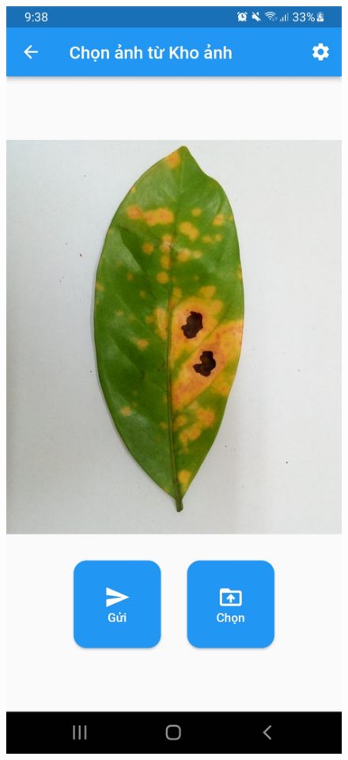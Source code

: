 \documentclass[a4paper,14pt]{extarticle}
\begin{document}
\begin{figure}[H]
		\includegraphics[scale=0.1]{images/screenshot3.jpg}

\end{figure}
\end{document}
